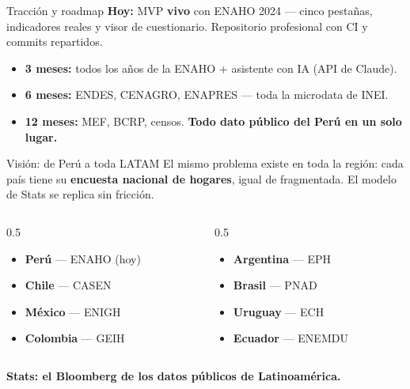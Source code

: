 \documentclass[aspectratio=169,11pt]{beamer}
\newcommand{\impacto}[1]{{\Large\color{AzulStats}\textbf{#1}}}
\begin{document}
\begin{frame}{Tracción y roadmap}
  \textbf{Hoy:} MVP \textcolor{NaranjaStats}{\textbf{vivo}} con ENAHO 2024 --- cinco pestañas,
  indicadores reales y visor de cuestionario. Repositorio profesional con CI y commits repartidos.\par
  \vspace{0.45cm}
  \begin{itemize}
    \item \textbf{3 meses:} todos los años de la ENAHO + asistente con IA (API de Claude).
    \item \textbf{6 meses:} ENDES, CENAGRO, ENAPRES --- toda la microdata de INEI.
    \item \textbf{12 meses:} MEF, BCRP, censos. \textbf{Todo dato público del Perú en un solo lugar.}
  \end{itemize}
\end{frame}

\begin{frame}{Visión: de Perú a toda LATAM}
  El mismo problema existe en toda la región: cada país tiene su \textbf{encuesta nacional de
  hogares}, igual de fragmentada. El modelo de Stats se replica sin fricción.\par
  \vspace{0.35cm}
  \begin{columns}[T]
    \begin{column}{0.5\textwidth}
      \small
      \begin{itemize}
        \item \textbf{Perú} --- ENAHO \textcolor{NaranjaStats}{(hoy)}
        \item \textbf{Chile} --- CASEN
        \item \textbf{México} --- ENIGH
        \item \textbf{Colombia} --- GEIH
      \end{itemize}
    \end{column}
    \begin{column}{0.5\textwidth}
      \small
      \begin{itemize}
        \item \textbf{Argentina} --- EPH
        \item \textbf{Brasil} --- PNAD
        \item \textbf{Uruguay} --- ECH
        \item \textbf{Ecuador} --- ENEMDU
      \end{itemize}
    \end{column}
  \end{columns}
  \vspace{0.35cm}
  \begin{center}
    \impacto{Stats: el Bloomberg de los datos públicos de Latinoamérica.}
  \end{center}
\end{frame}
\end{document}
